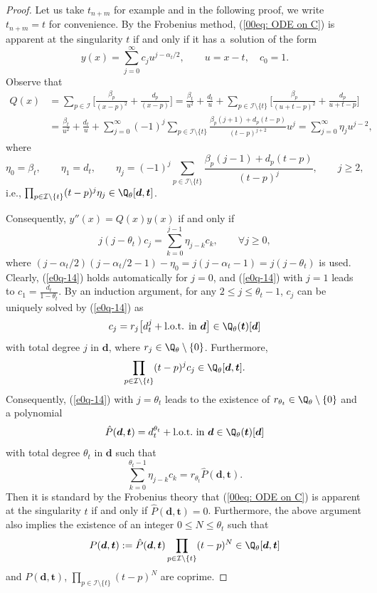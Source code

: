 \begin{proof} Let us take $t_{n+m}$ for example and in the following proof, we write $t_{n+m}=t$ for convenience. By the Frobenius method, (\ref{00eq: ODE on C}) is apparent at the singularity $t$ if and only if it has a~solution of the form
\[y(x)=\sum_{j=0}^{\infty}c_j u^{j-\alpha_{t}/2},\qquad u=x-t,\quad c_0=1.\]
Observe that
{\allowdisplaybreaks
\begin{align*}
Q(x)&=\sum_{p\in\mathcal{I}}\biggl[\frac{\beta_p}{(x-p)^2}+\frac{d_p}{(x-p)}\biggr]
=
\frac{\beta_t}{u^2}+\frac{d_t}{u}
+\sum_{p\in\mathcal{I}\setminus\{t\}}
\biggl[\frac{\beta_p}{(u+t-p)^2}+\frac{d_p}{u+t-p}\biggr]\\
&=\frac{\beta_t}{u^2}+\frac{d_t}{u}
+\sum_{j=0}^\infty(-1)^{j} \sum_{p\in\mathcal{I}\setminus\{t\}}\frac{\beta_p(j+1)+d_p(t-p)}{(t-p)^{j+2}}u^j
=\sum_{j=0}^{\infty}\eta_j u^{j-2},
\end{align*}
}%
where
\[\eta_0=\beta_t,\qquad \eta_1=d_t,\qquad
 \eta_j=(-1)^{j} \sum_{p\in\mathcal{I}\setminus\{t\}}\frac{\beta_p(j-1)+d_p(t-p)}{(t-p)^{j}},\qquad j\geq 2,
 \]
i.e., $\prod_{p\in\mathcal{I}\setminus\{t\}}(t-p)^j\eta_j\in \Q_\theta[\boldsymbol d,\boldsymbol t]$.

Consequently, $y''(x)=Q(x)y(x)$ if and only if
\begin{equation}\label{e0q-14}
j(j-\theta_t)c_j=\sum_{k=0}^{j-1}\eta_{j-k}c_k,\qquad\forall j\geq 0,
\end{equation}
where $(j-\alpha_t/2)(j-\alpha_t/2-1)-\eta_0=j(j-\alpha_t-1)=j(j-\theta_t)$ is used. Clearly, (\ref{e0q-14}) holds automatically for $j=0$, and (\ref{e0q-14}) with $j=1$ leads to $c_1=\frac{d_t}{1-\theta_t}$. By an induction argument, for any $2\leq j\leq \theta_t-1$, $c_j$ can be uniquely solved by (\ref{e0q-14}) as
\[c_j=r_j\bigl[d_{t}^j+\text{l.o.t. in $\boldsymbol d$}\bigr]\in \Q_\theta(\boldsymbol t)[\boldsymbol d]\]
with total degree $j$ in $\boldsymbol d$,
where $r_j\in\Q_\theta\setminus\{0\}$. Furthermore,
\[\prod_{p\in\mathcal{I}\setminus\{t\}}(t-p)^j c_j\in \Q_\theta[\boldsymbol d,\boldsymbol t].\]
Consequently, (\ref{e0q-14}) with $j=\theta_t$ leads to the existence of $r_{\theta_t}\in\Q_\theta\setminus\{0\}$ and a polynomial
\[\hat{P}(\boldsymbol d, \boldsymbol t)=d_t^{\theta_t}+\text{l.o.t.\ in $\boldsymbol d$}\in \Q_\theta(\boldsymbol t)[\boldsymbol d]\]
with total degree $\theta_t$ in $\boldsymbol d$ such that
\[
 \sum_{k=0}^{\theta_t-1}\eta_{j-k}c_k=r_{\theta_t}
 \hat{P}(\boldsymbol d, \boldsymbol t).
\]
Then it is standard by the Frobenius theory that (\ref{00eq: ODE on
 C}) is apparent at the singularity $t$ if and only if
$\hat{P}(\boldsymbol d, \boldsymbol t)=0$.
Furthermore, the above argument also implies the existence of an integer $0\leq N\leq \theta_t$ such that
\[
 P(\boldsymbol d, \boldsymbol t):=\hat{P}(\boldsymbol d, \boldsymbol
 t)\prod_{p\in\mathcal{I}\setminus\{t\}}(t-p)^{N}\in
 \Q_\theta[\boldsymbol d,\boldsymbol t]
\]
and $P(\boldsymbol d, \boldsymbol t)$, $\prod_{p\in\mathcal{I}\setminus\{t\}}(t-p)^{N}$ are coprime.
\end{proof}
